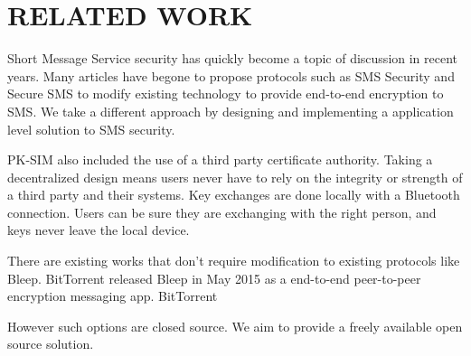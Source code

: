 \section{RELATED WORK}
Short Message Service security has quickly become a topic of discussion in recent years.
Many articles have begone to propose protocols such as SMS Security\cite{SmsSecurity} and Secure SMS\cite{SecureSms} to modify existing technology to provide end-to-end encryption to SMS.
We take a different approach by designing and implementing a application level solution to SMS security.

PK-SIM\cite{PkSim} also included the use of a third party certificate authority.
Taking a decentralized design means users never have to rely on the integrity or strength of a third party and their systems. Key exchanges are done locally with a Bluetooth connection.
Users can be sure they are exchanging with the right person, and keys never leave the local device.

There are existing works that don't require modification to existing protocols like Bleep\cite{bleep}.
BitTorrent released Bleep in May 2015 as a end-to-end peer-to-peer encryption messaging app.
BitTorrent

However such options are closed source. We aim to provide a freely available open source solution.
